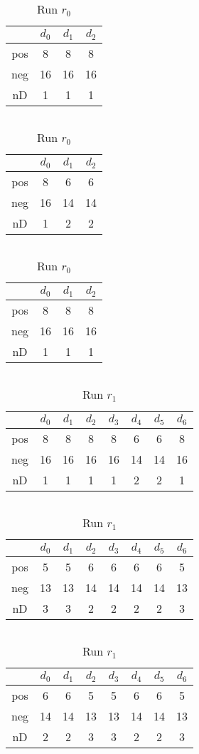 
\begin{table}[h]
$\quad$ %
\begin{tabular}{| c | c c c |}
 \hline
  & $d_0$ & $d_1$ & $d_2$ \\
 \hline 
 pos & 8  & 8  & 8 \\
 neg & 16  & 16  & 16 \\
 nD & 1  & 1  & 1 \\\hline 
\end{tabular}
$\quad$ %
\begin{tabular}{| c | c c c |}
 \hline
  & $d_0$ & $d_1$ & $d_2$ \\
 \hline 
 pos & 8  & 6  & 6 \\
 neg & 16  & 14  & 14 \\
 nD & 1  & 2  & 2 \\\hline 
\end{tabular}
$\quad$ %
\begin{tabular}{| c | c c c |}
 \hline
  & $d_0$ & $d_1$ & $d_2$ \\
 \hline 
 pos & 8  & 8  & 8 \\
 neg & 16  & 16  & 16 \\
 nD & 1  & 1  & 1 \\
\hline 
\end{tabular}
\caption{Run $r_0$}
\end{table}

\begin{table}[h]
$\quad$ %
\begin{tabular}{| c | c c c c c c c |}
 \hline
  & $d_0$ & $d_1$ & $d_2$ & $d_3$ & $d_4$ & $d_5$ & $d_6$ \\
 \hline
 pos & 8  & 8  & 8  & 8  & 6  & 6  & 8 \\
 neg & 16  & 16  & 16  & 16  & 14  & 14  & 16 \\
 nD & 1  & 1  & 1  & 1  & 2  & 2  & 1 \\\hline 
\end{tabular} 
\vspace{.25in}
$\quad$ %
\begin{tabular}{| c | c c c c c c c |}
 \hline
  & $d_0$ & $d_1$ & $d_2$ & $d_3$ & $d_4$ & $d_5$ & $d_6$ \\
 \hline
 pos & 5  & 5  & 6  & 6  & 6  & 6  & 5 \\
 neg & 13  & 13  & 14  & 14  & 14  & 14  & 13 \\
 nD & 3  & 3  & 2  & 2  & 2  & 2  & 3 \\\hline 
\end{tabular}
$\quad$ %
\begin{tabular}{| c | c c c c c c c |}
 \hline
  & $d_0$ & $d_1$ & $d_2$ & $d_3$ & $d_4$ & $d_5$ & $d_6$ \\
 \hline
 pos & 6  & 6  & 5  & 5  & 6  & 6  & 5 \\
 neg & 14  & 14  & 13  & 13  & 14  & 14  & 13 \\
 nD & 2  & 2  & 3  & 3  & 2  & 2  & 3 \\\hline 
\end{tabular}
$ \; \; \; $
\\
\caption{Run $r_1$}
\end{table}


